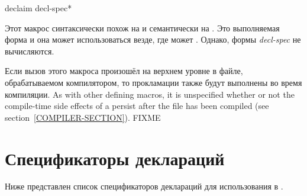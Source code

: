\begin{newer}

\begin{defmac}
declaim {decl-spec}*

Этот макрос синтаксически похож на  и семантически на
. Это выполняемая форма и она может использоваться везде, где
может . Однако, формы \emph{decl-spec} не вычисляются.

Если вызов этого макроса произошёл на верхнем уровне в файле, обрабатываемом
компилятором, то прокламации также будут выполнены во время компиляции. 
  As with other defining macros, it is 
  unspecified whether or not the compile-time side effects of a 
   persist after the file has been compiled
  (see section~\ref{COMPILER-SECTION}). FIXME
\end{defmac}
\end{newer}

\section{Спецификаторы деклараций}
\label{DECLARATION-SPECIFIERS-SECTION}

Ниже представлен список спецификаторов деклараций для использования в
.

